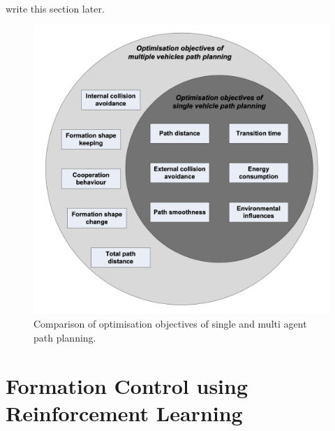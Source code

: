 \documentclass[letterpaper,12pt]{article}
\begin{document}
write this section later.

\begin{figure}
	\centering
	\includegraphics[width=5in]{compsinglemultipathplanning.png}
	\caption{Comparison of optimisation objectives of single and multi agent path planning.}
	\label{fig:compsinglemultipathplanning} 
\end{figure}

\section{Formation Control using Reinforcement Learning}





\newpage


\end{document}
